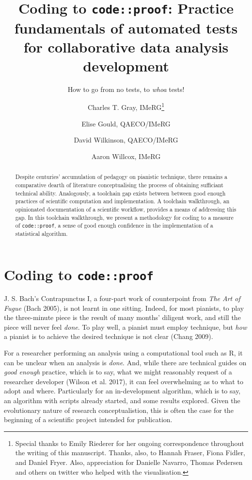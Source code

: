 \documentclass[
]{article}
\title{Coding to \texttt{code::proof}: Practice fundamentals of
automated tests for collaborative data analysis development}
\subtitle{How to go from no tests, to \emph{whoa} tests!}
\author{Charles T. Gray, IMeRG\footnote{Special thanks to Emily Riederer
  for her ongoing correspondence throughout the writing of this
  manuscript. Thanks, also, to Hannah Fraser, Fiona Fidler, and Daniel
  Fryer. Also, appreciation for Danielle Navarro, Thomas Pedersen and
  others on twitter who helped with the visualisation.} \and Elise
Gould, QAECO/IMeRG \and David Wilkinson, QAECO/IMeRG \and Aaron Willcox,
IMeRG}
\date{}
\begin{document}
\maketitle
\begin{abstract}
Despite centuries' accumulation of pedagogy on pianistic technique,
there remains a comparative dearth of literature conceptualising the
process of obtaining sufficiant technical ability. Analogously, a
toolchain gap exists between between good enough practices of scientific
computation and implementation. A toolchain walkthrough, an opinionated
documentation of a scientific workflow, provides a means of addressing
this gap. In this toolchain walkthrough, we present a methodology for
coding to a measure of \texttt{code::proof}, a sense of good enough
confidence in the implementation of a statistical algorithm.
\end{abstract}

\newcommand{\codereg}[1]{
\fbox{\begin{minipage}{15em}
#1
\end{minipage}}
}

\hypertarget{coding-to-codeproof}{%
\section{\texorpdfstring{Coding to
\texttt{code::proof}}{Coding to code::proof}}\label{coding-to-codeproof}}

J. S. Bach's Contrapunctus I, a four-part work of counterpoint from
\emph{The Art of Fugue} (Bach 2005), is not learnt in one sitting.
Indeed, for most pianists, to play the three-minute piece is the result
of many months' diligent work, and still the piece will never feel
\emph{done}. To play well, a pianist must employ technique, but
\emph{how} a pianist is to achieve the desired technique is not clear
(Chang 2009).

For a researcher performing an analysis using a computational tool such
as R, it can be unclear when an analysis is \emph{done}. And, while
there are technical guides on \emph{good enough} practice, which is to
say, what we might reasonably request of a researcher developer (Wilson
et al. 2017), it can feel overwhelming as to what to adopt and where.
Particularly for an in-development algorithm, which is to say, an
algorithm with scripts already started, and some results explored. Given
the evolutionary nature of research conceptualistion, this is often the
case for the beginning of a scientific project intended for publication.
\end{document}
